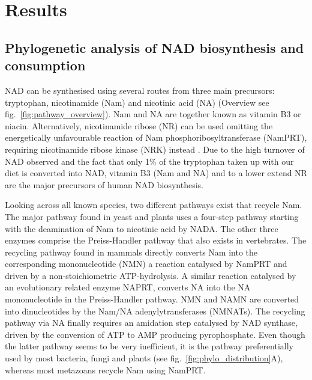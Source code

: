 
\section{Results}

\subsection{Phylogenetic analysis of NAD biosynthesis and consumption}

NAD can be synthesised using several routes from three main precursors: tryptophan, nicotinamide (Nam) and nicotinic acid (NA) (Overview see fig.~\ref{fig:pathway_overview}). Nam and NA are together known as vitamin B3 or niacin. Alternatively, nicotinamide ribose (NR) can be used omitting the energetically unfavourable reaction of Nam phosphoribosyltransferase (NamPRT), requiring nicotinamide ribose kinase (NRK) instead \cite{Yoshino2018}. Due to the high turnover of NAD observed and the fact that only 1\% of the tryptophan taken up with our diet is converted into NAD, vitamin B3 (Nam and NA) and to a lower extend NR are the major precursors of human NAD biosynthesis.

Looking across all known species, two different pathways exist that recycle Nam. The major pathway found in yeast and plants uses a four-step pathway starting with the deamination of Nam to nicotinic acid by NADA. The other three enzymes comprise the Preiss-Handler pathway that also exists in vertebrates. The recycling pathway found in mammals directly converts Nam into the corresponding mononucleotide (NMN) a reaction catalysed by NamPRT and driven by a non-stoichiometric ATP-hydrolysis. A similar reaction catalysed by an evolutionary related enzyme NAPRT, converts NA into the NA mononucleotide in the Preiss-Handler pathway. NMN and NAMN are converted into dinucleotides by the Nam/NA adenylytransferases (NMNATs). The recycling pathway via NA finally requires an amidation step catalysed by NAD synthase, driven by the conversion of ATP to AMP producing pyrophosphate. Even though the latter pathway seems to be very inefficient, it is the pathway preferentially used by most bacteria, fungi and plants (see fig.~\ref{fig:phylo_distribution}A), whereas most metazoans recycle Nam using NamPRT.

